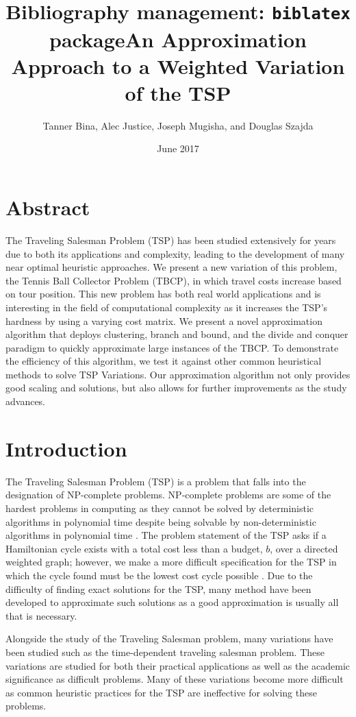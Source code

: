 \documentclass[sigconf, anonymous, pdftex]{acmart}
\title{Bibliography management: \texttt{biblatex} package}
\title{An Approximation Approach to a Weighted Variation of the TSP}
\author{Tanner Bina, Alec Justice, Joseph Mugisha, and Douglas Szajda}
\date{June 2017}
\begin{document}
\maketitle

\section{Abstract}

The Traveling Salesman Problem (TSP) has been studied extensively for years due to both its applications and complexity, leading to the development of many near optimal heuristic approaches. We present a new variation of this problem, the Tennis Ball Collector Problem (TBCP), in which travel costs increase based on tour position. This new problem has both real world applications and is interesting in the field of computational complexity as it increases the TSP's hardness by using a varying cost matrix. We present a novel approximation algorithm that deploys clustering, branch and bound, and the divide and conquer paradigm to quickly approximate large instances of the TBCP. To demonstrate the efficiency of this algorithm, we test it against other common heuristical methods to solve TSP Variations. Our approximation algorithm not only provides good scaling and solutions, but also allows for further improvements as the study advances.

\section{Introduction}

The Traveling Salesman Problem (TSP) is a problem that falls into the designation of NP-complete problems. NP-complete problems are some of the hardest problems in computing as they cannot be solved by deterministic algorithms in polynomial time despite being solvable by non-deterministic algorithms in polynomial time \cite{pVsNp}. The problem statement of the TSP asks if a Hamiltonian cycle exists with a total cost less than a budget, $b$, over a directed weighted graph; however, we make a more difficult specification for the TSP in which the cycle found must be the lowest cost cycle possible \cite{tspAll}. Due to the difficulty of finding exact solutions for the TSP, many method have been developed to approximate such solutions as a good approximation is usually all that is necessary\cite{approximateTSP}.


Alongside the study of the Traveling Salesman problem, many variations have been studied such as the time-dependent traveling salesman problem\cite{tdtspDefinition}\cite{tspAll}. These variations are studied for both their practical applications as well as the academic significance as difficult problems. Many of these variations become more difficult as common heuristic practices for the TSP are ineffective for solving these problems.
\end{document}
